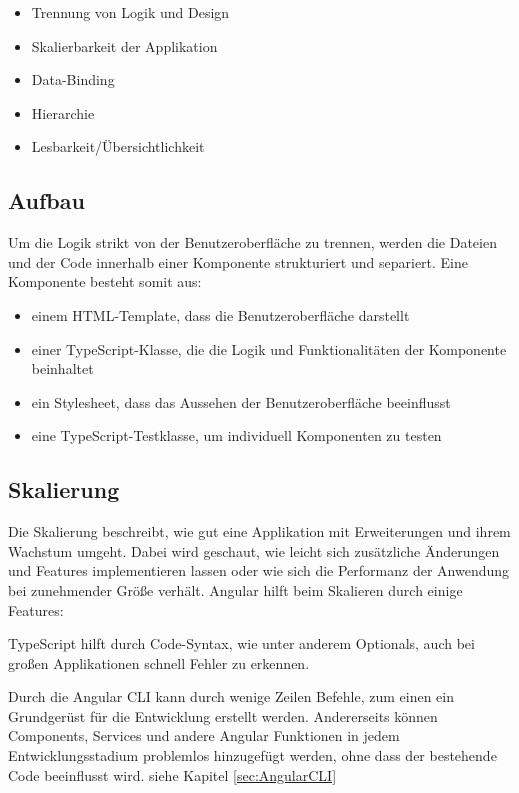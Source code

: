 \begin{itemize}
    \item Trennung von Logik und Design
    \item Skalierbarkeit der Applikation
    \item Data-Binding
    \item Hierarchie
    \item Lesbarkeit/Übersichtlichkeit
\end{itemize}

\subsection{Aufbau}
Um die Logik strikt von der Benutzeroberfläche zu trennen, werden die Dateien und der Code innerhalb einer Komponente strukturiert und separiert. Eine Komponente besteht somit aus: 

\begin{itemize}
    \item einem HTML-Template, dass die Benutzeroberfläche darstellt
    \item einer TypeScript-Klasse, die die Logik und Funktionalitäten der Komponente beinhaltet
    \item ein Stylesheet, dass das Aussehen der Benutzeroberfläche beeinflusst
    \item eine TypeScript-Testklasse, um individuell Komponenten zu testen 
\end{itemize}

\cite{AngularComponentOverview}

\subsection{Skalierung}
Die Skalierung beschreibt, wie gut eine Applikation mit Erweiterungen und ihrem Wachstum umgeht. Dabei wird geschaut, wie leicht sich zusätzliche Änderungen und Features implementieren lassen oder wie sich die Performanz der Anwendung bei zunehmender Größe verhält. Angular hilft beim Skalieren durch einige Features:

TypeScript hilft durch Code-Syntax, wie unter anderem Optionals, auch bei großen Applikationen schnell Fehler zu erkennen. 

Durch die Angular CLI kann durch wenige Zeilen Befehle, zum einen ein Grundgerüst für die Entwicklung erstellt werden. Andererseits können Components, Services und andere Angular Funktionen in jedem Entwicklungsstadium problemlos hinzugefügt werden, ohne dass der bestehende Code beeinflusst wird. siehe Kapitel \ref{sec:AngularCLI}

